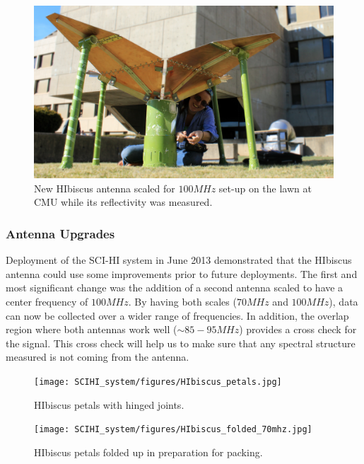 \begin{figure}[htb]
\begin{center}
\includegraphics[width=0.95\linewidth]{SCIHI_system/figures/HIbiscus_100mhz.jpg}
\caption{New HIbiscus antenna scaled for $100 MHz$ set-up on the lawn at CMU while its reflectivity was measured. }
\label{Fig:hibiscus_100}
\end{center}
\end{figure}

\subsubsection{Antenna Upgrades} \label{Sec:HIant_upgrade}

Deployment of the SCI-HI system in June 2013 demonstrated that the HIbiscus antenna could use some improvements prior to future deployments. The first and most significant change was the addition of a second antenna scaled to have a center frequency of $100 MHz$. By having both scales ($70 MHz$ and $100 MHz$), data can now be collected over a wider range of frequencies. In addition, the overlap region where both antennas work well ($\sim 85-95 MHz$) provides a cross check for the signal. This cross check will help us to make sure that any spectral structure measured is not coming from the antenna. 

\begin{figure}[htb]
\centering
\begin{minipage}[b]{0.33\textwidth}
\centering
\texttt{[image: SCIHI\_system/figures/HIbiscus\_petals.jpg]}
\caption{HIbiscus petals with hinged joints.}
\label{Fig:hibiscus_petal}
\end{minipage}%
\begin{minipage}[b]{0.02\textwidth}
\hspace{1cm}
\end{minipage}%
\begin{minipage}[b]{0.62\textwidth}
\centering
\texttt{[image: SCIHI\_system/figures/HIbiscus\_folded\_70mhz.jpg]}
\caption{HIbiscus petals folded up in preparation for packing.}
\label{Fig:hibiscus_fold}
\end{minipage}
\end{figure}

